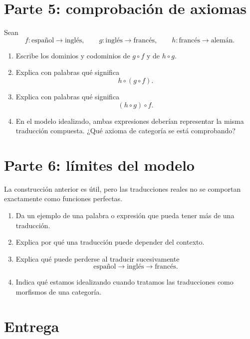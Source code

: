 \documentclass[11pt,a4paper]{article}
\begin{document}
\section*{Parte 5: comprobación de axiomas}

Sean
\[
  f:\text{español}\to\text{inglés},
  \qquad
  g:\text{inglés}\to\text{francés},
  \qquad
  h:\text{francés}\to\text{alemán}.
\]

\begin{enumerate}
  \item Escribe los dominios y codominios de \(g\circ f\) y de \(h\circ g\).

  \item Explica con palabras qué significa
  \[
    h\circ(g\circ f).
  \]

  \item Explica con palabras qué significa
  \[
    (h\circ g)\circ f.
  \]

  \item En el modelo idealizado, ambas expresiones deberían representar la misma
  traducción compuesta. ¿Qué axioma de categoría se está comprobando?
\end{enumerate}

\section*{Parte 6: límites del modelo}

La construcción anterior es útil, pero las traducciones reales no se comportan
exactamente como funciones perfectas.

\begin{enumerate}
  \item Da un ejemplo de una palabra o expresión que pueda tener más de una
  traducción.

  \item Explica por qué una traducción puede depender del contexto.

  \item Explica qué puede perderse al traducir sucesivamente
  \[
    \text{español}\to\text{inglés}\to\text{francés}.
  \]

  \item Indica qué estamos idealizando cuando tratamos las traducciones como
  morfismos de una categoría.
\end{enumerate}

\section*{Entrega}
\end{document}
